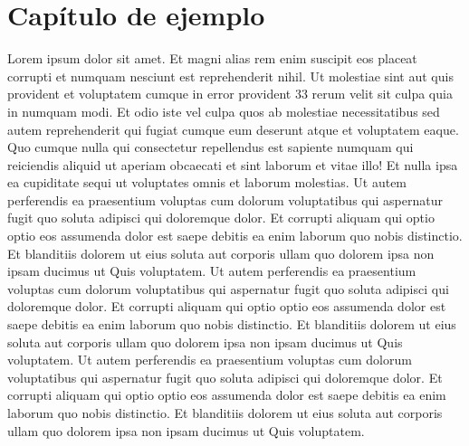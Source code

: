 \titleformat{\chapter}[display]
    {\normalfont\Large\bfseries}{\filleft\chaptertitlename\ \thechapter}{20pt}{\Huge}
    
\chapter{Capítulo de ejemplo}
    Lorem ipsum dolor sit amet. Et magni alias rem enim suscipit eos placeat corrupti et numquam nesciunt est reprehenderit nihil. Ut molestiae sint aut quis provident et voluptatem cumque in error provident 33 rerum velit sit culpa quia in numquam modi. Et odio iste vel culpa quos ab molestiae necessitatibus sed autem reprehenderit qui fugiat cumque eum deserunt atque et voluptatem eaque.
    \newline
    Quo cumque nulla qui consectetur repellendus est sapiente numquam qui reiciendis aliquid ut aperiam obcaecati et sint laborum et vitae illo! Et nulla ipsa ea cupiditate sequi ut voluptates omnis et laborum molestias.
    \newline 
    Ut autem perferendis ea praesentium voluptas cum dolorum voluptatibus qui aspernatur fugit quo soluta adipisci qui doloremque dolor. Et corrupti aliquam qui optio optio eos assumenda dolor est saepe debitis ea enim laborum quo nobis distinctio. Et blanditiis dolorem ut eius soluta aut corporis ullam quo dolorem ipsa non ipsam ducimus ut Quis voluptatem.
    \newline 
    Ut autem perferendis ea praesentium voluptas cum dolorum voluptatibus qui aspernatur fugit quo soluta adipisci qui doloremque dolor. Et corrupti aliquam qui optio optio eos assumenda dolor est saepe debitis ea enim laborum quo nobis distinctio. Et blanditiis dolorem ut eius soluta aut corporis ullam quo dolorem ipsa non ipsam ducimus ut Quis voluptatem.
    \newline 
    Ut autem perferendis ea praesentium voluptas cum dolorum voluptatibus qui aspernatur fugit quo soluta adipisci qui doloremque dolor. Et corrupti aliquam qui optio optio eos assumenda dolor est saepe debitis ea enim laborum quo nobis distinctio. Et blanditiis dolorem ut eius soluta aut corporis ullam quo dolorem ipsa non ipsam ducimus ut Quis voluptatem.
    \newline 
